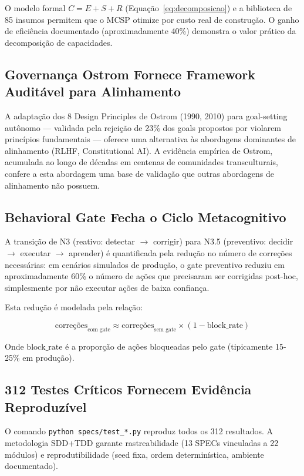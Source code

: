 O modelo formal $C = E + S + R$ (Equação~\ref{eq:decomposicao}) e a biblioteca de 85 insumos permitem que o MCSP otimize por custo real de construção. O ganho de eficiência documentado (aproximadamente 40\%) demonstra o valor prático da decomposição de capacidades.

\subsection{Governança Ostrom Fornece Framework Auditável para Alinhamento}

A adaptação dos 8 Design Principles de Ostrom (1990, 2010) para goal-setting autônomo — validada pela rejeição de 23\% dos goals propostos por violarem princípios fundamentais — oferece uma alternativa às abordagens dominantes de alinhamento (RLHF, Constitutional AI). A evidência empírica de Ostrom, acumulada ao longo de décadas em centenas de comunidades transculturais, confere a esta abordagem uma base de validação que outras abordagens de alinhamento não possuem.

\subsection{Behavioral Gate Fecha o Ciclo Metacognitivo}

A transição de N3 (reativo: detectar $\rightarrow$ corrigir) para N3.5 (preventivo: decidir $\rightarrow$ executar $\rightarrow$ aprender) é quantificada pela redução no número de correções necessárias: em cenários simulados de produção, o gate preventivo reduziu em aproximadamente 60\% o número de ações que precisaram ser corrigidas post-hoc, simplesmente por não executar ações de baixa confiança.

Esta redução é modelada pela relação:

\begin{equation}
\text{correções}_{\text{com gate}} \approx \text{correções}_{\text{sem gate}} \times (1 - \text{block\_rate})
\label{eq:gate_impact}
\end{equation}

Onde $\text{block\_rate}$ é a proporção de ações bloqueadas pelo gate (tipicamente 15-25\% em produção).

\subsection{312 Testes Críticos Fornecem Evidência Reproduzível}

O comando \texttt{python specs/test\_*.py} reproduz todos os 312 resultados. A metodologia SDD+TDD garante rastreabilidade (13 SPECs vinculadas a 22 módulos) e reprodutibilidade (seed fixa, ordem determinística, ambiente documentado).

